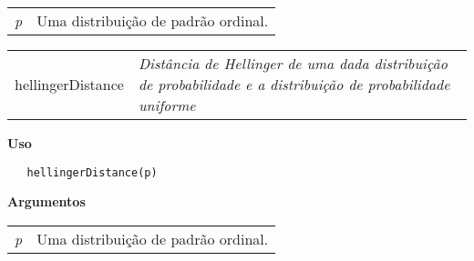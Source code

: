 \begin{table}[!ht]
\begin{center}
\begin{tabularx}{\textwidth}{X X}
\hspace{0.5cm} \textit{p} & Uma distribuição de padrão ordinal.\\
\end{tabularx}
\end{center}
\end{table} 

\newpage


\hrulefill   

\begin{table}[!ht]
\begin{center}
\begin{tabularx}{\textwidth}{ X X}
\hspace{0.5cm} hellingerDistance & \textit{Distância  de Hellinger de uma dada distribuição de probabilidade e a distribuição de probabilidade uniforme}\\
\end{tabularx}
\end{center}
\end{table} 

\vspace{-0.5cm}

\hrulefill  

\vspace{0.5cm}

\textbf{Uso}

\begin{lstlisting}
   hellingerDistance(p)
\end{lstlisting}

\vspace{0.5cm}

\textbf{Argumentos}

\begin{table}[!ht]
\begin{center}
\begin{tabularx}{\textwidth}{X X}
\hspace{0.5cm} \textit{p} & Uma distribuição de padrão ordinal.\\
\end{tabularx}
\end{center}
\end{table} 


